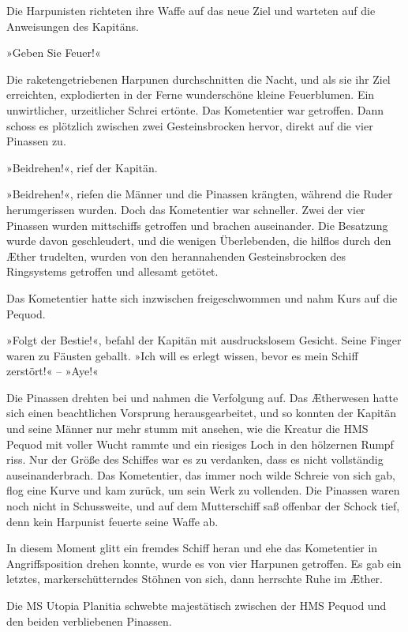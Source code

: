 Die Harpunisten richteten ihre Waffe auf das neue Ziel und warteten
auf die Anweisungen des Kapitäns.

»Geben Sie Feuer!«

Die raketengetriebenen Harpunen durchschnitten die Nacht, und als
sie ihr Ziel erreichten, explodierten in der Ferne wunderschöne
kleine Feuerblumen. Ein unwirtlicher, urzeitlicher Schrei ertönte.
Das Kometentier war getroffen. Dann schoss es plötzlich zwischen
zwei Gesteinsbrocken hervor, direkt auf die vier Pinassen zu.

»Beidrehen!«, rief der Kapitän.

»Beidrehen!«, riefen die Männer und die Pinassen krängten, während
die Ruder herumgerissen wurden. Doch das Kometentier war schneller.
Zwei der vier Pinassen wurden mittschiffs getroffen und brachen
auseinander. Die Besatzung wurde davon geschleudert, und die
wenigen Überlebenden, die hilflos durch den Æther trudelten, wurden
von den herannahenden Gesteinsbrocken des Ringsystems getroffen und
allesamt getötet.

Das Kometentier hatte sich inzwischen freigeschwommen und nahm Kurs
auf die Pequod.

»Folgt der Bestie!«, befahl der Kapitän mit ausdruckslosem Gesicht.
Seine Finger waren zu Fäusten geballt. »Ich will es erlegt wissen,
bevor es mein Schiff zerstört!« – »Aye!«

Die Pinassen drehten bei und nahmen die Verfolgung auf. Das
Ætherwesen hatte sich einen beachtlichen Vorsprung
herausgearbeitet, und so konnten der Kapitän und seine Männer nur
mehr stumm mit ansehen, wie die Kreatur die HMS Pequod mit voller
Wucht rammte und ein riesiges Loch in den hölzernen Rumpf riss. Nur
der Größe des Schiffes war es zu verdanken, dass es nicht
vollständig auseinanderbrach. Das Kometentier, das immer noch wilde
Schreie von sich gab, flog eine Kurve und kam zurück, um sein Werk
zu vollenden. Die Pinassen waren noch nicht in Schussweite, und auf
dem Mutterschiff saß offenbar der Schock tief, denn kein Harpunist
feuerte seine Waffe ab.

\bigpar

In diesem Moment glitt ein fremdes Schiff heran und ehe das
Kometentier in Angriffsposition drehen konnte, wurde es von vier
Harpunen getroffen. Es gab ein letztes, markerschütterndes Stöhnen
von sich, dann herrschte Ruhe im Æther.

Die MS Utopia Planitia schwebte majestätisch zwischen der HMS
Pequod und den beiden verbliebenen Pinassen.

